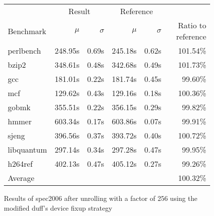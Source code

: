 \begin{figure}[h]
    \begin{center}
        \begin{tabular}{lrrrrr}
            \toprule
            & \multicolumn{2}{c}{Result} & \multicolumn{2}{c}{Reference}\\
            Benchmark & $\mu$ & $\sigma$ & $\mu$ & $\sigma$ & Ratio to reference\\
            \midrule
            perlbench & 248.95s & 0.69s & 245.18s & 0.62s & 101.54\%\\
            bzip2 & 348.61s & 0.48s & 342.68s & 0.49s & 101.73\%\\
            gcc & 181.01s & 0.22s & 181.74s & 0.45s & 99.60\%\\
            mcf & 129.62s & 0.43s & 129.16s & 0.18s & 100.36\%\\
            gobmk & 355.51s & 0.22s & 356.15s & 0.29s & 99.82\%\\
            hmmer & 603.34s & 0.17s & 603.86s & 0.07s & 99.91\%\\
            sjeng & 396.56s & 0.37s & 393.72s & 0.40s & 100.72\%\\
            libquantum & 297.14s & 0.34s & 297.28s & 0.47s & 99.95\%\\
            h264ref & 402.13s & 0.47s & 405.12s & 0.27s & 99.26\%\\
            \midrule
            Average & & & & & 100.32\%\\
            \bottomrule
        \end{tabular}
    \end{center}
    \caption{Results of spec2006 after unrolling with a factor of 256 using the modified duff's device fixup strategy}
    \label{fig:eval:perf:duff:256}
\end{figure}
